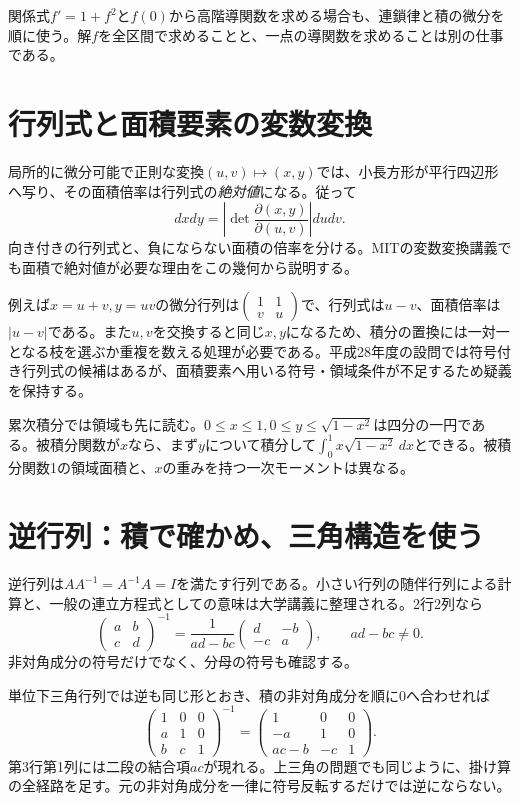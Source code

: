 関係式$f'=1+f^2$と$f(0)$から高階導関数を求める場合も、連鎖律と積の微分を順に使う。解$f$を全区間で求めることと、一点の導関数を求めることは別の仕事である。

\section{行列式と面積要素の変数変換}
\label{theory:analysis:jacobian}
局所的に微分可能で正則な変換$(u,v)\mapsto(x,y)$では、小長方形が平行四辺形へ写り、その面積倍率は行列式の\emph{絶対値}になる。従って
\[
 dxdy=\left|\det\frac{\partial(x,y)}{\partial(u,v)}\right|dudv.
\]
向き付きの行列式と、負にならない面積の倍率を分ける。MITの変数変換講義でも面積で絶対値が必要な理由をこの幾何から説明する\parencite{mit_jacobian2007}。

例えば$x=u+v,y=uv$の微分行列は$\left(\begin{smallmatrix}1&1\\v&u\end{smallmatrix}\right)$で、行列式は$u-v$、面積倍率は$|u-v|$である。また$u,v$を交換すると同じ$x,y$になるため、積分の置換には一対一となる枝を選ぶか重複を数える処理が必要である。平成28年度の設問では符号付き行列式の候補はあるが、面積要素へ用いる符号・領域条件が不足するため疑義を保持する。

累次積分では領域も先に読む。$0\le x\le1,0\le y\le\sqrt{1-x^2}$は四分の一円である。被積分関数が$x$なら、まず$y$について積分して$\int_0^1x\sqrt{1-x^2}\,dx$とできる。被積分関数1の領域面積と、$x$の重みを持つ一次モーメントは異なる。

\section{逆行列：積で確かめ、三角構造を使う}
\label{theory:analysis:inverse}
逆行列は$AA^{-1}=A^{-1}A=I$を満たす行列である。小さい行列の随伴行列による計算と、一般の連立方程式としての意味は大学講義に整理される\parencite{mit_inverse2007}。2行2列なら
\[
 \begin{pmatrix}a&b\\c&d\end{pmatrix}^{-1}
 =\frac{1}{ad-bc}\begin{pmatrix}d&-b\\-c&a\end{pmatrix},
 \qquad ad-bc\neq0.
\]
非対角成分の符号だけでなく、分母の符号も確認する。

単位下三角行列では逆も同じ形とおき、積の非対角成分を順に0へ合わせれば
\[
 \begin{pmatrix}1&0&0\\a&1&0\\b&c&1\end{pmatrix}^{-1}
 =\begin{pmatrix}1&0&0\\-a&1&0\\ac-b&-c&1\end{pmatrix}.
\]
第3行第1列には二段の結合項$ac$が現れる。上三角の問題でも同じように、掛け算の全経路を足す。元の非対角成分を一律に符号反転するだけでは逆にならない。

